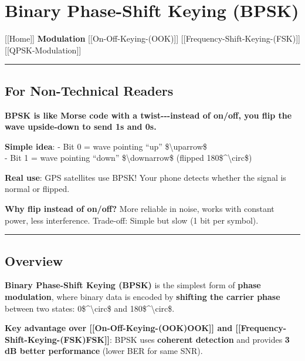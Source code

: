 \section{Binary Phase-Shift Keying
(BPSK)}\label{binary-phase-shift-keying-bpsk}

{[}{[}Home{]}{]} \textbar{} \textbf{Modulation} \textbar{}
{[}{[}On-Off-Keying-(OOK){]}{]} \textbar{}
{[}{[}Frequency-Shift-Keying-(FSK){]}{]} \textbar{}
{[}{[}QPSK-Modulation{]}{]}

\begin{center}\rule{0.5\linewidth}{0.5pt}\end{center}

\subsection{\texorpdfstring{ For Non-Technical
Readers}{ For Non-Technical Readers}}\label{for-non-technical-readers}

\textbf{BPSK is like Morse code with a twist-\/-\/-instead of on/off,
you flip the wave upside-down to send 1s and 0s.}

\textbf{Simple idea}: - Bit 0 = wave pointing ``up''
\$\textbackslash uparrow\$\\
- Bit 1 = wave pointing ``down'' \$\textbackslash downarrow\$ (flipped
180\$\^{}\textbackslash circ\$)

\textbf{Real use}: GPS satellites use BPSK! Your phone detects whether
the signal is normal or flipped.

\textbf{Why flip instead of on/off?} More reliable in noise, works with
constant power, less interference. Trade-off: Simple but slow (1 bit per
symbol).

\begin{center}\rule{0.5\linewidth}{0.5pt}\end{center}

\subsection{Overview}\label{overview}

\textbf{Binary Phase-Shift Keying (BPSK)} is the simplest form of
\textbf{phase modulation}, where binary data is encoded by
\textbf{shifting the carrier phase} between two states:
0\$\^{}\textbackslash circ\$ and 180\$\^{}\textbackslash circ\$.

\textbf{Key advantage over {[}{[}On-Off-Keying-(OOK)\textbar OOK{]}{]}
and {[}{[}Frequency-Shift-Keying-(FSK)\textbar FSK{]}{]}}: BPSK uses
\textbf{coherent detection} and provides \textbf{3 dB better
performance} (lower BER for same SNR).

